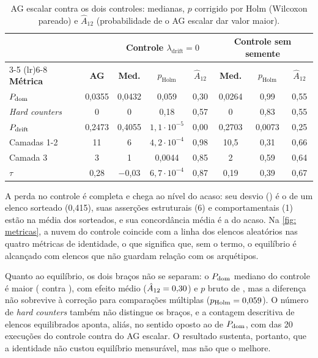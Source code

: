 \begin{table}[htb]
    \caption[AG escalar contra os dois controles]{AG escalar contra os dois controles: medianas, $p$ corrigido por Holm (Wilcoxon pareado) e $\hat{A}_{12}$ (probabilidade de o AG escalar dar valor maior).}
    \label{tab: controles}
    \centering
    \small
    \begin{tabular}{l c c c c c c c}
        \toprule
        & & \multicolumn{3}{c}{\textbf{Controle $\lambda_{\mathrm{drift}} = 0$}} & \multicolumn{3}{c}{\textbf{Controle sem semente}} \\
        \cmidrule(lr){3-5} \cmidrule(lr){6-8}
        \textbf{Métrica} & \textbf{AG} & \textbf{Med.} & $p_{\mathrm{Holm}}$ & $\hat{A}_{12}$ & \textbf{Med.} & $p_{\mathrm{Holm}}$ & $\hat{A}_{12}$ \\
        \midrule
        $P_{\mathrm{dom}}$              & 0,0355 & 0,0432  & 0,059                & 0,30 & 0,0264 & 0,99   & 0,55 \\
        \textit{Hard counters} & 0    & 0       & 0,18                 & 0,57 & 0      & 0,83   & 0,55 \\
        $P_{\mathrm{drift}}$            & 0,2473 & 0,4055  & $1{,}1\cdot10^{-5}$  & 0,00 & 0,2703 & 0,0073 & 0,25 \\
        Camadas 1-2          & 11     & 6       & $4{,}2\cdot10^{-4}$  & 0,98 & 10,5   & 0,31   & 0,66 \\
        Camada 3             & 3      & 1       & 0,0044               & 0,85 & 2      & 0,59   & 0,64 \\
        $\tau$               & 0,28   & $-$0,03 & $6{,}7\cdot10^{-4}$  & 0,87 & 0,19   & 0,39   & 0,67 \\
        \bottomrule
    \end{tabular}
    \source
\end{table}

A perda no controle é completa e chega ao nível do acaso: seu desvio (\driftLzero{}) é o de um elenco sorteado (0,415), suas asserções estruturais (6) e comportamentais (1) estão na média dos sorteados, e sua concordância média é a do acaso. Na \autoref{fig: metricas}, a nuvem do controle coincide com a linha dos elencos aleatórios nas quatro métricas de identidade, o que significa que, sem o termo, o equilíbrio é alcançado com elencos que não guardam relação com os arquétipos.

Quanto ao equilíbrio, os dois braços não se separam: o $P_{\mathrm{dom}}$ mediano do controle é maior (\domLzero{} contra \domAG{}), com efeito médio ($\hat{A}_{12} = 0{,}30{}$) e $p$ bruto de \pBrutoLzeroDom{}, mas a diferença não sobrevive à correção para comparações múltiplas ($p_{\mathrm{Holm}} = 0{,}059{}$). O número de \textit{hard counters} também não distingue os braços, e a contagem descritiva de elencos equilibrados aponta, aliás, no sentido oposto ao de $P_{\mathrm{dom}}$, com \equilLzero{} das 20 execuções do controle contra \equilAG{} do AG escalar. O resultado sustenta, portanto, que a identidade não custou equilíbrio mensurável, mas não que o melhore.

